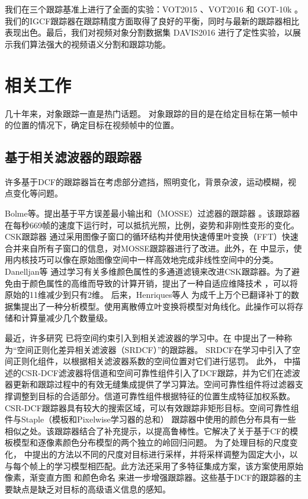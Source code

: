我们在三个跟踪基准上进行了全面的实验：VOT2015 \cite{Kristan2015TheVO}、VOT2016 \cite{Kristan2016TheVO} 和 GOT-10k \cite{GOT-10k}。我们的IGCF跟踪器在跟踪精度方面取得了良好的平衡，同时与最新的跟踪器相比表现出色。最后，我们对视频对象分割数据集 DAVIS2016 \cite{Perazzi2016} 进行了定性实验，以展示我们算法强大的视频语义分割和跟踪功能。

\section{相关工作}
几十年来，对象跟踪一直是热门话题。 对象跟踪的目的是在给定目标在第一帧中的位置的情况下，确定目标在视频帧中的位置。

\subsection{基于相关滤波器的跟踪器}
许多基于DCF的跟踪器旨在考虑部分遮挡，照明变化，背景杂波，运动模糊，视点变化等问题。

Bolme等。提出基于平方误差最小输出和（MOSSE）过滤器的跟踪器 \cite{bolme2010visual} 。该跟踪器在每秒669帧的速度下运行时，可以抵抗光照，比例，姿势和非刚性变形的变化。
CSK跟踪器 \cite{Henriques2012ExploitingTC} 通过采用图像子窗口的循环结构并使用快速傅里叶变换（FFT）快速合并来自所有子窗口的信息，对MOSSE跟踪器进行了改进。此外，在 \cite{Henriques2012ExploitingTC} 中显示，使用内核技巧可以像在原始图像空间中一样高效地完成非线性空间中的分类。
Danelljan等 \cite{Danelljan2014AdaptiveCA} 通过学习有关多维颜色属性的多通道滤镜来改进CSK跟踪器。为了避免由于颜色属性的高维而导致的计算开销，提出了一种自适应维降技术 \cite{Danelljan2014AdaptiveCA} ，可以将原始的11维减少到只有2维。
后来，Henriques等人 \cite{henriques2014high-speed} 为成千上万个已翻译补丁的数据集提出了一种分析模型。使用离散傅立叶变换将模型对角线化。此操作可以将存储和计算量减少几个数量级。

最近，许多研究 \cite{Danelljan2015LearningSR, Lukezic2017DiscriminativeCF} 已将空间约束引入到相关滤波器的学习中。在 \cite{Danelljan2015LearningSR} 中提出了一种称为“空间正则化差异相关滤波器（SRDCF）”的跟踪器。 SRDCF在学习中引入了空间正则化组件，以根据相关滤波器系数的空间位置对它们进行惩罚。
此外， \cite{Lukezic2017DiscriminativeCF} 中描述的CSR-DCF滤波器将信道和空间可靠性组件引入了DCF跟踪，并为它们在滤波器更新和跟踪过程中的有效无缝集成提供了学习算法。空间可靠性组件将过滤器支撑调整到目标的合适部分。信道可靠性组件根据特征的位置生成特征加权系数。 CSR-DCF跟踪器具有较大的搜索区域，可以有效跟踪非矩形目标。空间可靠性组件与Staple（模板和Pixelwise学习器的总和） \cite{Bertinetto2016StapleC} 跟踪器中使用的颜色分布具有一些相似之处。该跟踪器结合了补充提示，以提高鲁棒性。它解决了关于基于CF的模板模型和逐像素颜色分布模型的两个独立的岭回归问题。
为了处理目标的尺度变化， \cite{Li2014ASA} 中提出的方法以不同的尺度对目标进行采样，并将采样调整为固定大小，以与每个帧上的学习模型相匹配。此方法还采用了多特征集成方案，该方案使用原始像素，渐变直方图 \cite{Forsyth2014ObjectDW} 和颜色命名 \cite{Weijer2009LearningCN} 来进一步增强跟踪器。这些基于DCF的跟踪器的主要缺点是缺乏对目标的高级语义信息的感知。

